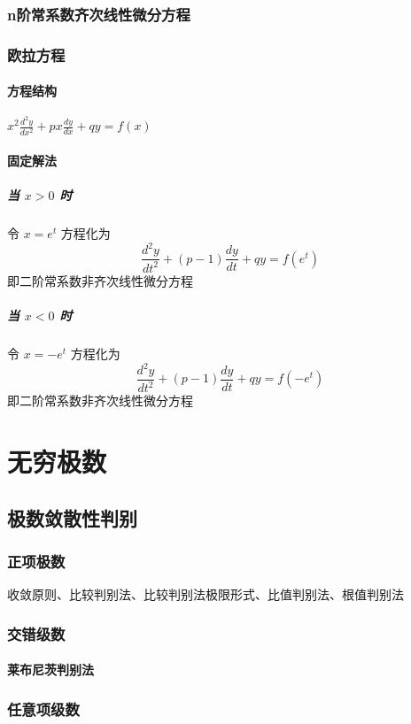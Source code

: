 ﻿\documentclass[a4paper,12pt,UTF8]{ctexart}
\begin{document}
    \subsubsection{n阶常系数齐次线性微分方程}

    \subsubsection{欧拉方程}
    \paragraph{方程结构} \(x^{2}\frac{d^2y}{dx^2}+px\frac{dy}{dx}+qy=f(x)\)
    \paragraph{固定解法}
    \subparagraph{当 \(x>0\) 时} 令 \(x=e^t\) 方程化为 \[\frac{d^2y}{dt^2}+(p-1)\frac{dy}{dt}+qy=f(e^t)\] 即二阶常系数非齐次线性微分方程
    \subparagraph{当 \(x<0\) 时} 令 \(x=-e^t\) 方程化为 \[\frac{d^2y}{dt^2}+(p-1)\frac{dy}{dt}+qy=f(-e^t)\] 即二阶常系数非齐次线性微分方程

    \section{无穷极数}

    \subsection{极数敛散性判别}

    \subsubsection{正项极数}

    收敛原则、比较判别法、比较判别法极限形式、比值判别法、根值判别法

    \subsubsection{交错级数}

    \paragraph{莱布尼茨判别法}

    \subsubsection{任意项级数}
\end{document}
